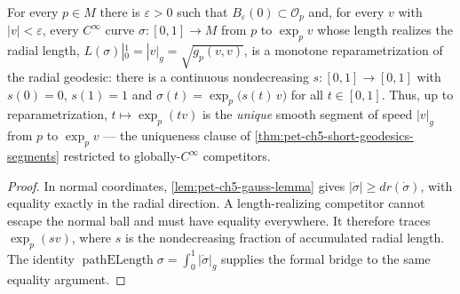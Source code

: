 \begin{lemma}
  \label{lem:pet-ch5-radial-geodesic-unique}


  For every $p\in M$ there is $\varepsilon>0$ such that $B_\varepsilon(0)\subset
  \mathcal O_p$ and, for every $v$ with $|v|<\varepsilon$, every $C^\infty$ curve
  $\sigma:[0,1]\to M$ from $p$ to $\exp_p v$ whose length realizes the radial
  length, $L(\sigma)|_0^1=|v|_g=\sqrt{g_p(v,v)}$, is a monotone reparametrization
  of the radial geodesic: there is a continuous nondecreasing $s:[0,1]\to[0,1]$
  with $s(0)=0$, $s(1)=1$ and $\sigma(t)=\exp_p\bigl(s(t)\,v\bigr)$ for all
  $t\in[0,1]$. Thus, up to reparametrization, $t\mapsto\exp_p(tv)$ is the
  \emph{unique} smooth segment of speed $|v|_g$ from $p$ to $\exp_p v$ — the
  uniqueness clause of \cref{thm:pet-ch5-short-geodesics-segments} restricted to
  globally-$C^\infty$ competitors.
\end{lemma}
\begin{proof}

  \sketch
  In normal coordinates, \cref{lem:pet-ch5-gauss-lemma} gives
  $|\dot\sigma|\ge dr(\dot\sigma)$, with equality exactly in the radial direction.
  A length-realizing competitor cannot escape the normal ball and must have
  equality everywhere.  It therefore traces $\exp_p(sv)$, where $s$ is the
  nondecreasing fraction of accumulated radial length.  The identity
  $\operatorname{pathELength}\sigma=\int_0^1|\dot\sigma|_g$ supplies the formal
  bridge to the same equality argument.
\end{proof}

